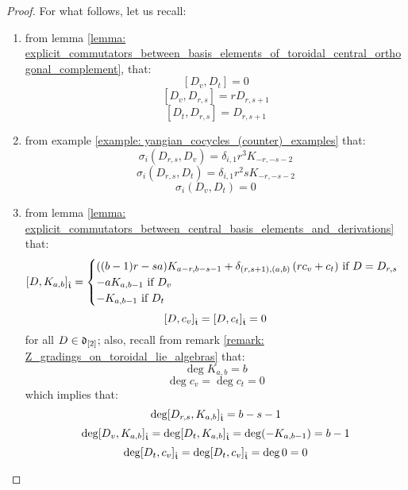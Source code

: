 \begin{proof}
                For what follows, let us recall:
                \begin{enumerate}
                    \item from lemma \ref{lemma: explicit_commutators_between_basis_elements_of_toroidal_central_orthogonal_complement}, that:
                        $$[D_v, D_t] = 0$$
                        $$[D_v, D_{r, s}] = r D_{r, s + 1}$$
                        $$[D_t, D_{r, s}] = D_{r, s + 1}$$
                    \item from example \ref{example: yangian_cocycles_(counter)_examples} that:
                        $$\sigma_i(D_{r, s}, D_v) = \delta_{i, 1} r^3 K_{-r, -s - 2}$$
                        $$\sigma_i(D_{r, s}, D_t) = \delta_{i, 1} r^2 s K_{-r, -s - 2}$$
                        $$\sigma_i(D_v, D_t) = 0$$
                    \item from lemma \ref{lemma: explicit_commutators_between_central_basis_elements_and_derivations} that:
                        $$
                            [D, K_{a, b}]_{\hat{\mathfrak{t}}} =
                            \begin{cases}
                                \text{$((b - 1)r - sa) K_{a - r, b - s - 1} + \delta_{(r, s + 1), (a, b)} \left( r c_v + c_t \right)$ if $D = D_{r, s}$}
                                \\
                                \text{$-a K_{a, b - 1}$ if $D_v$}
                                \\
                                \text{$-K_{a, b - 1}$ if $D_t$}
                            \end{cases}
                        $$
                        $$[D, c_v]_{\hat{\mathfrak{t}}} = [D, c_t]_{\hat{\mathfrak{t}}} = 0$$
                    for all $D \in \mathfrak{d}_{[2]}$; also, recall from remark \ref{remark: Z_gradings_on_toroidal_lie_algebras} that:
                        $$\deg K_{a, b} = b$$
                        $$\deg c_v = \deg c_t = 0$$
                    which implies that:
                        $$\deg [D_{r, s}, K_{a, b}]_{\hat{\mathfrak{t}}} = b - s - 1$$
                        $$\deg [D_v, K_{a, b}]_{\hat{\mathfrak{t}}} = \deg [D_t, K_{a, b}]_{\hat{\mathfrak{t}}} = \deg(-K_{a, b - 1}) = b - 1$$
                        $$\deg [D_t, c_v]_{\hat{\mathfrak{t}}} = \deg [D_t, c_v]_{\hat{\mathfrak{t}}} = \deg 0 = 0$$
                \end{enumerate}


\end{proof}
